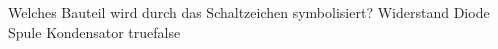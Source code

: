     {Welches Bauteil wird durch das Schaltzeichen symbolisiert?}
    {Widerstand}
    {Diode}
    {Spule}
    {Kondensator}
    {true}{false}